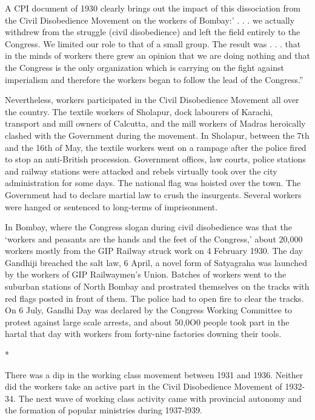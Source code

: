 A CPI document of 1930 clearly brings out the impact of this dissociation from the Civil Disobedience Movement on the workers of Bombay:’ . . . we actually withdrew from the struggle (civil disobedience) and left the field entirely to the Congress. We limited our role to that of a small group. The result was . . . that in the minds of workers there grew an opinion that we are doing nothing and that the Congress is the only organization which is carrying on the fight against imperialism and therefore the workers began to follow the lead of the Congress.”

Nevertheless, workers participated in the Civil Disobedience Movement all over the country. The textile workers of Sholapur, dock labourers of Karachi, transport and mill owners of Calcutta, and the mill workers of Madras heroically clashed with the Government during the movement. In Sholapur, between the 7th and the 16th of May, the textile workers went on a rampage after the police fired to stop an anti-British procession. Government offices, law courts, police stations and railway stations were attacked and rebels virtually took over the city administration for some days. The national flag was hoisted over the town. The Government had to declare martial law to crush the insurgents. Several workers were hanged or sentenced to long-terms of imprisonment.

In Bombay, where the Congress slogan during civil disobedience was that the ‘workers and peasants are the hands and the feet of the Congress,’ about 20,000 workers mostly from the GIP Railway struck work on 4 February 1930. The day Gandhiji breached the salt law, 6 April, a novel form of Satyagraha was launched by the workers of GIP Railwaymen’s Union. Batches of workers went to the suburban stations of North Bombay and prostrated themselves on the tracks with red flags posted in front of them. The police had to open fire to clear the tracks. On 6 July, Gandhi Day was declared by the Congress Working Committee to protest against large scale arrests, and about 50,0O0 people took part in the hartal that day with workers from forty-nine factories downing their tools.

\begin{center}*\end{center}



There was a dip in the working class movement between 1931 and 1936. Neither did the workers take an active part in the Civil Disobedience Movement of 1932-34. The next wave of working class activity came with provincial autonomy and the formation of popular ministries during 1937-l939.

